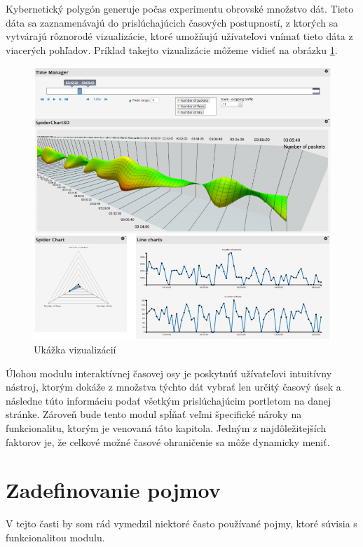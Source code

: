 \documentclass[
  digital, %
  twoside, %
  notable,   %
  nolof,   %
  nolot,   %
]{fithesis3}
\begin{document}
Kybernetický polygón generuje počas experimentu obrovské množstvo dát. Tieto dáta sa zaznamenávajú do prislúchajúcich časových postupností, z ktorých sa vytvárajú rôznorodé vizualizácie, ktoré umožňujú užívateľovi vnímať tieto dáta z viacerých pohľadov. Príklad takejto vizualizácie môžeme vidieť na obrázku \ref{visualization}.

\begin{figure}
	\center
	\includegraphics[width=1.0\linewidth]{visualization}
	\caption{Ukážka vizualizácií\cite{eichler2014analytical}}
	\label{visualization}
\end{figure}

Úlohou modulu interaktívnej časovej osy je poskytnúť užívateľovi intuitívny nástroj, ktorým dokáže z množstva týchto dát vybrať len určitý časový úsek a následne túto informáciu podať všetkým prislúchajúcim portletom na danej stránke. Zároveň bude tento modul spĺňať veľmi špecifické nároky na funkcionalitu, ktorým je venovaná táto kapitola. Jedným z najdôležitejších faktorov je, že celkové možné časové ohraničenie sa môže dynamicky meniť.

\section{Zadefinovanie pojmov}
V tejto časti by som rád vymedzil niektoré často používané pojmy, ktoré súvisia s funkcionalitou modulu.
\end{document}
